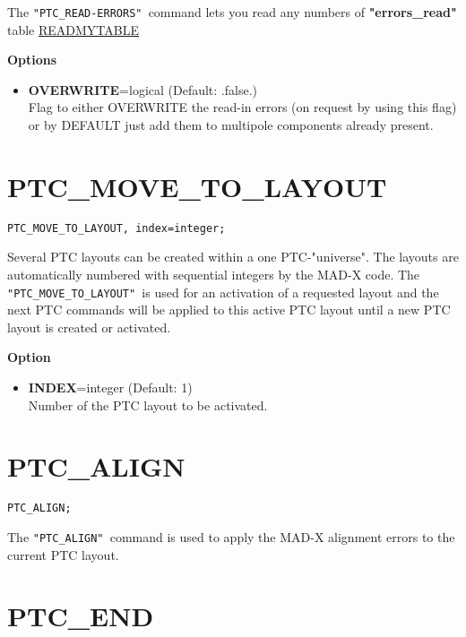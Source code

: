 The \texttt{"PTC\_READ-ERRORS" }command lets you read any numbers of
\textbf{"errors\_read"} table
\href{../control/general.html#readmytable}{READMYTABLE}  

{\bf Options} \\ 
\begin{itemize}
   \item {\bf OVERWRITE}=logical (Default: .false.) \\ 
     Flag to either OVERWRITE the read-in errors (on request by
     using this flag) or by DEFAULT just add them to multipole
     components already present.
\end{itemize}
       

\section{PTC\_MOVE\_TO\_LAYOUT}

\begin{verbatim}
PTC_MOVE_TO_LAYOUT, index=integer;
\end{verbatim}


Several PTC layouts can be created within a one PTC-"universe". The
layouts are automatically numbered with sequential integers  by the
MAD-X code. The \texttt{"PTC\_MOVE\_TO\_LAYOUT" }is used for an
activation of a requested layout and the next PTC commands will be
applied to this active PTC layout until a new PTC layout is created
or activated. 

{\bf Option} \\
\begin{itemize}
   \item {\bf INDEX}=integer (Default: 1) \\
     Number of the PTC layout to be activated.
\end{itemize}

\section{PTC\_ALIGN}

\begin{verbatim}
PTC_ALIGN;
\end{verbatim}

The \texttt{"PTC\_ALIGN" }command is used to apply the MAD-X alignment
errors to the current PTC layout.  

\section{PTC\_END}

